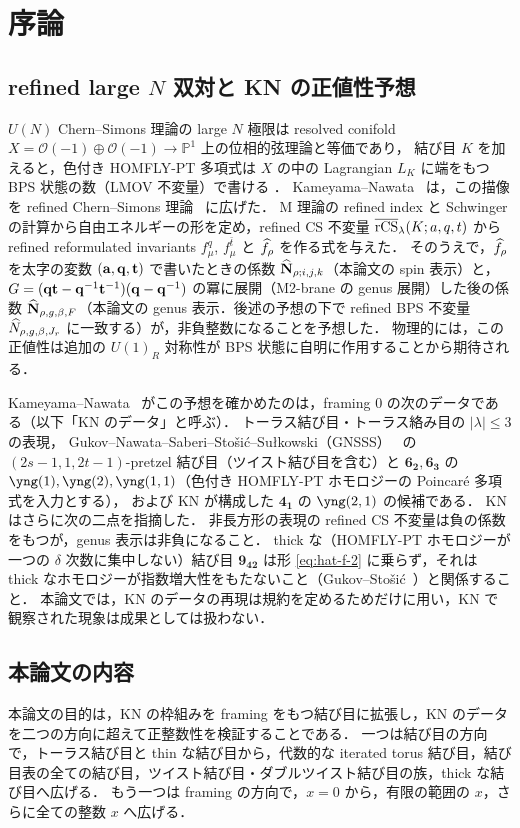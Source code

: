 \section{序論}\label{sec:intro}

\subsection{refined large $N$ 双対と KN の正値性予想}
$U(N)$ Chern--Simons 理論の large $N$ 極限は resolved conifold $X=\mathcal{O}(-1)\oplus\mathcal{O}(-1)\to\mathbb{P}^1$ 上の位相的弦理論と等価であり，
結び目 $K$ を加えると，色付き HOMFLY-PT 多項式は $X$ の中の Lagrangian $L_K$ に端をもつ BPS 状態の数（LMOV 不変量）で書ける
\cite{Ooguri99,Labastida01}．
Kameyama--Nawata~\cite{Kameyama17} は，この描像を refined Chern--Simons 理論~\cite{Aganagic11} に広げた．
M 理論の refined index と Schwinger の計算から自由エネルギーの形を定め，refined CS 不変量 $\overline{\textrm{rCS}}_\lambda(K;a,q,t)$ から
refined reformulated invariants $f^q_\mu$, $f^{\bar t}_\mu$ と $\widehat{f}_\rho$ を作る式を与えた．
そのうえで，$\widehat{f}_\rho$ を太字の変数 $(\mathbf{a},\mathbf{q},\mathbf{t})$ で書いたときの係数 $\widehat{\mathbf{N}}_{\rho;i,j,k}$（本論文の spin 表示）と，
$G=(\mathbf{q}\mathbf{t}-\mathbf{q}^{-1}\mathbf{t}^{-1})(\mathbf{q}-\mathbf{q}^{-1})$ の冪に展開（M2-brane の genus 展開）した後の係数 $\widehat{\mathbf{N}}_{\rho,g,\beta,F}$（本論文の genus 表示．後述の予想の下で refined BPS 不変量 $\widehat{N}_{\rho,g,\beta,J_r}$ に一致する）が，非負整数になることを予想した．
物理的には，この正値性は追加の $U(1)_R$ 対称性が BPS 状態に自明に作用することから期待される．

Kameyama--Nawata~\cite{Kameyama17} がこの予想を確かめたのは，framing 0 の次のデータである（以下「KN のデータ」と呼ぶ）．
トーラス結び目・トーラス絡み目の $|\lambda|\le 3$ の表現，
Gukov--Nawata--Saberi--Stošić--Sułkowski（GNSSS）~\cite{Gukov15} の $(2s-1,1,2t-1)$-pretzel 結び目（ツイスト結び目を含む）と $\mathbf{6_2},\mathbf{6_3}$ の $\yng(1),\yng(2),\yng(1,1)$（色付き HOMFLY-PT ホモロジーの Poincaré 多項式を入力とする），
および KN が構成した $\mathbf{4_1}$ の $\yng(2,1)$ の候補である．
KN はさらに次の二点を指摘した．
非長方形の表現の refined CS 不変量は負の係数をもつが，genus 表示は非負になること．
thick な（HOMFLY-PT ホモロジーが一つの $\delta$ 次数に集中しない）結び目 $\mathbf{9_{42}}$ は形 \eqref{eq:hat-f-2} に乗らず，それは thick なホモロジーが指数増大性をもたないこと（Gukov--Stošić~\cite{Gukov11}）と関係すること．
本論文では，KN のデータの再現は規約を定めるためだけに用い，KN で観察された現象は成果としては扱わない．

\subsection{本論文の内容}
本論文の目的は，KN の枠組みを framing をもつ結び目に拡張し，KN のデータを二つの方向に超えて正整数性を検証することである．
一つは結び目の方向で，トーラス結び目と thin な結び目から，代数的な iterated torus 結び目，結び目表の全ての結び目，ツイスト結び目・ダブルツイスト結び目の族，thick な結び目へ広げる．
もう一つは framing の方向で，$x=0$ から，有限の範囲の $x$，さらに全ての整数 $x$ へ広げる．

